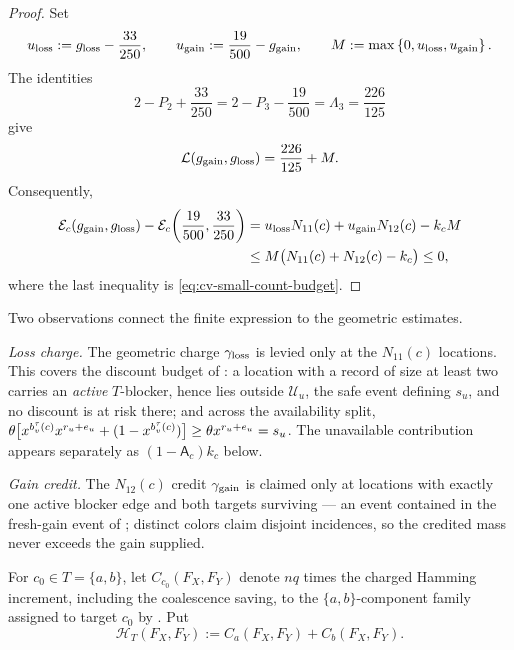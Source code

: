 \begin{proof}
Set
\[
 u_{\rm loss}:=g_{\rm loss}-\frac{33}{250},\qquad
 u_{\rm gain}:=\frac{19}{500}-g_{\rm gain},\qquad
 M:=\max\left\{0,u_{\rm loss},u_{\rm gain}\right\}.
\]
The identities
\[
 2-P_2+\frac{33}{250}
 =2-P_3-\frac{19}{500}
 =\Lambda_3=\frac{226}{125}
\]
give
\[
 \mathcal L(g_{\rm gain},g_{\rm loss})=\frac{226}{125}+M.
\]
Consequently,
\begin{align*}
 \mathcal E_c(g_{\rm gain},g_{\rm loss})
 -\mathcal E_c\!\left(\frac{19}{500},\frac{33}{250}\right)
 &=u_{\rm loss}N_{11}(c)+u_{\rm gain}N_{12}(c)-k_cM\\
 &\le M\bigl(N_{11}(c)+N_{12}(c)-k_c\bigr)\le0,
\end{align*}
where the last inequality is \eqref{eq:cv-small-count-budget}.
\end{proof}

Two observations connect the finite expression to the geometric estimates.

\smallskip\noindent\emph{Loss charge.}
The geometric charge $\gamma_{\rm loss}$
is levied only at the $N_{11}(c)$ locations. This covers the discount
budget of : a location with a record of size at least two
carries an \emph{active} \(T\)-blocker, hence lies outside
\(\mathcal U_u\), the safe event defining \(s_u\), and no discount is
at risk there; and across the
availability split,
$\theta\bigl[x^{b_v^\tau(c)}x^{r_u+e_u}+(1-x^{b_v^\tau(c)})\bigr]\ge
\theta x^{r_u+e_u}=s_u$.  The unavailable contribution appears
separately as $(1-\mathsf A_c)k_c$ below.

\smallskip\noindent\emph{Gain credit.}
The $N_{12}(c)$ credit $\gamma_{\rm gain}$ is claimed
only at locations with exactly one active blocker edge and both targets
surviving --- an event contained in the fresh-gain event of
; distinct colors claim disjoint incidences, so
the credited mass never exceeds the gain supplied.

For \(c_0\in T=\{a,b\}\), let \(C_{c_0}(F_X,F_Y)\) denote \(nq\) times
the charged Hamming increment, including the coalescence saving,
to the \(\{a,b\}\)-component family assigned to target \(c_0\) by
.  Put
\[
  \mathcal H_T(F_X,F_Y):=C_a(F_X,F_Y)+C_b(F_X,F_Y).
\]

